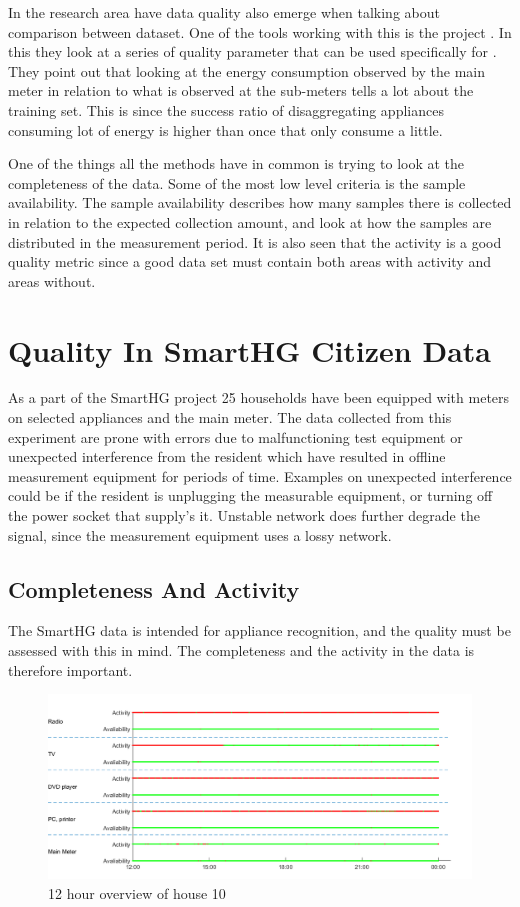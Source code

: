 In the  research area have data quality also emerge when talking about comparison between dataset. One of the tools working with this is the  project \citep{RefWorks:21}. In this they look at a series of quality parameter that can be used specifically for . They point out that looking at the energy consumption observed by the main meter in relation to what is observed at the sub-meters tells a lot about the training set. This is since the success ratio of disaggregating appliances consuming lot of energy is higher than once that only consume a little. 

One of the things all the methods have in common is trying to look at the completeness of the data. Some of the most low level criteria is the sample availability. The sample availability describes how many samples there is collected in relation to the expected collection amount, and look at how the samples are distributed in the measurement period. It is also seen that the activity is a good quality metric since a good data set must contain both areas with activity and areas without. 

\section{Quality In SmartHG Citizen Data}
As a part of the SmartHG project 25 households have been equipped with meters on selected appliances and the main meter. The data collected from this experiment are prone with errors due to malfunctioning test equipment or unexpected interference from the resident which have resulted in offline measurement equipment for periods of time. Examples on unexpected interference could be if the resident is unplugging the measurable equipment, or turning off the power socket that supply's it. Unstable network does further degrade the signal, since the measurement equipment uses a lossy network. 

\subsection{Completeness And Activity}
The SmartHG data is intended for appliance recognition, and the quality must be assessed with this in mind. The completeness and the activity in the data is therefore important. 

\begin{figure}[H]
\centering
\includegraphics[width=1\textwidth]{billeder/Test.png}
\caption{12 hour overview of house 10}
\label{fig:12HRes}
\end{figure}

